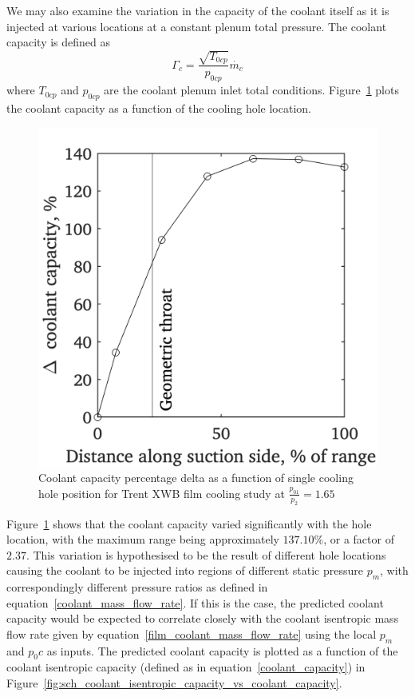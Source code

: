 \documentclass[a4paper, 11pt, oneside]{report}
\begin{document}
\newpage
We may also examine the variation in the capacity of the coolant itself as it is injected at various locations at a constant plenum total pressure. The coolant capacity is defined as
\begin{equation}\label{coolant_capacity}
\Gamma_c =
\frac{\sqrt{T_{0cp}}}{p_{0cp}}
\dot{m_c}
\end{equation}
where $T_{0cp}$ and $p_{0cp}$ are the coolant plenum inlet total conditions.
Figure~\ref{fig:sch_hole_location_vs_coolant_capacity} plots the coolant capacity as a function of the cooling hole location.

\begin{figure}[H]
      \centering
      \includegraphics[width=.45\textwidth]{figs/sch_hole_location_vs_coolant_capacity.png}
      \caption{Coolant capacity percentage delta as a function of single cooling hole position for Trent XWB film cooling study at $\frac{p_{01}}{p_2}=1.65$}
      \label{fig:sch_hole_location_vs_coolant_capacity}
\end{figure}

Figure~\ref{fig:sch_hole_location_vs_coolant_capacity} shows that the coolant capacity varied significantly with the hole location, with the maximum range being approximately $137.10\%$, or a factor of $2.37$. This variation is hypothesised to be the result of different hole locations causing the coolant to be injected into regions of different static pressure $p_m$, with correspondingly different pressure ratios as defined in equation~\ref{coolant_mass_flow_rate}. If this is the case, the predicted coolant capacity would be expected to correlate closely with the coolant isentropic mass flow rate given by equation~\ref{film_coolant_mass_flow_rate} using the local $p_m$ and $p_0c$ as inputs. The predicted coolant capacity is plotted as a function of the coolant isentropic capacity (defined as in equation~\ref{coolant_capacity}) in Figure~\ref{fig:sch_coolant_isentropic_capacity_vs_coolant_capacity}.
\end{document}
